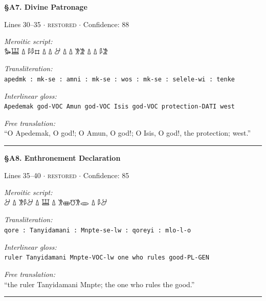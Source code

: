 \documentclass[11pt,a4paper]{article}
\begin{document}
{{{{{{\vspace{6pt}
\noindent\textbf{\S A7. Divine Patronage}
\hfill {\small Lines 30–35 $\cdot$ \textsc{restored} $\cdot$ Confidence: 88%

\vspace{3pt}
\noindent\textit{Meroitic script:}\\[2pt]
{\meroitic 𐦀𐦁 𐦗  𐦗 𐦀𐦂 𐦗  𐦗 𐦃 𐦗  𐦗 𐦕𐦁𐦁 𐦗 𐦓𐦖}

\vspace{4pt}
\noindent\textit{Transliteration:}\\[2pt]
\texttt{apedmk : mk-se : amni : mk-se : wos : mk-se : selele-wi : tenke}

\vspace{4pt}
\noindent\textit{Interlinear gloss:}\\[2pt]
{\small\texttt{Apedemak  god-VOC  Amun  god-VOC  Isis  god-VOC  protection-DATI  west}}

\vspace{4pt}
\noindent\textit{Free translation:}\\[2pt]
``O Apedemak, O god!; O Amun, O god!; O Isis, O god!, the protection; west.''

\vspace{2pt}
\noindent\rule{\textwidth}{0.3pt}


\vspace{6pt}
\noindent\textbf{\S A8. Enthronement Declaration}
\hfill {\small Lines 35–40 $\cdot$ \textsc{restored} $\cdot$ Confidence: 85%

\vspace{3pt}
\noindent\textit{Meroitic script:}\\[2pt]
{\meroitic 𐦃𐦁 𐦗 𐦑𐦂𐦒𐦈𐦂 𐦗 𐦓 𐦗 𐦃𐦁𐦂 𐦗 𐦃}

\vspace{4pt}
\noindent\textit{Transliteration:}\\[2pt]
\texttt{qore : Tanyidamani : Mnpte-se-lw : qoreyi : mlo-l-o}

\vspace{4pt}
\noindent\textit{Interlinear gloss:}\\[2pt]
{\small\texttt{ruler  Tanyidamani  Mnpte-VOC-lw  one who rules  good-PL-GEN}}

\vspace{4pt}
\noindent\textit{Free translation:}\\[2pt]
``the ruler Tanyidamani Mnpte; the one who rules the good.''

\vspace{2pt}
\noindent\rule{\textwidth}{0.3pt}


}}}}}}}}
\end{document}
